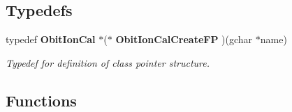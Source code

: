 \subsection*{Typedefs}
\begin{CompactItemize}
\item 
typedef {\bf Obit\-Ion\-Cal} $\ast$($\ast$ {\bf Obit\-Ion\-Cal\-Create\-FP} )(gchar $\ast$name)
\begin{CompactList}\small\item\em Typedef for definition of class pointer structure. \item\end{CompactList}\end{CompactItemize}
\subsection*{Functions}
